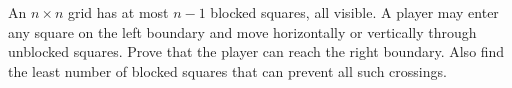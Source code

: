 An $n\times n$ grid has at most $n-1$ blocked squares, all visible. A player may enter any square on the left boundary and move horizontally or vertically through unblocked squares. Prove that the player can reach the right boundary. Also find the least number of blocked squares that can prevent all such crossings.
